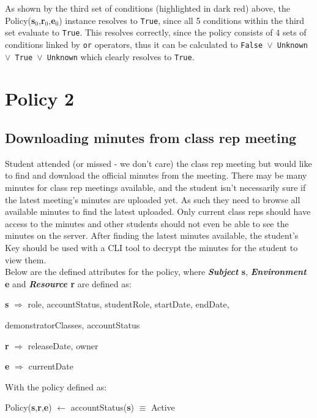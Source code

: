 \documentclass[a4paper,11pt]{article}
\begin{document}
As shown by the third set of conditions (\textcolor{Mahogany}{highlighted in dark red}) above, the Policy(\textbf{s$_{0}$},\textbf{r$_{0}$},\textbf{e$_{0}$}) instance resolves to \texttt{True}, since all 5 conditions within the third set evaluate to \texttt{True}. This resolves correctly, since the policy consists of 4 sets of conditions linked by \texttt{or} operators, thus it can be calculated to \texttt{False $\vee{}$ Unknown $\vee{}$ True $\vee{}$ Unknown} which clearly resolves to \texttt{True}.


\section{Policy 2}
\subsection{Downloading minutes from class rep meeting}
Student attended (or missed - we don't care) the class rep meeting but would like to find and download the official minutes from the meeting. There may be many minutes for class rep meetings available, and the student isn't necessarily sure if the latest meeting's minutes are uploaded yet. As such they need to browse all available minutes to find the latest uploaded. Only current class reps should have access to the minutes and other students should not even be able to see the minutes on the server. After finding the latest minutes available, the student's Key should be used with a CLI tool to decrypt the minutes for the student to view them.\\
Below are the defined attributes for the policy, where \textbf{\emph{Subject} s}, \textbf{\emph{Environment} e} and \textbf{\emph{Resource} r} are defined as:\\\par
\textbf{s} $\Rightarrow$ role, accountStatus, studentRole, startDate, endDate,\par
\hspace{0.8cm}demonstratorClasses, accountStatus\par
\textbf{r} $\Rightarrow$ releaseDate, owner\par
\textbf{e} $\Rightarrow$ currentDate\\\par
\noindent With the policy defined as:\\\par
Policy(\textbf{s},\textbf{r},\textbf{e}) $\leftarrow$ accountStatus(\textbf{s}) $\equiv$ Active\par
\end{document}
